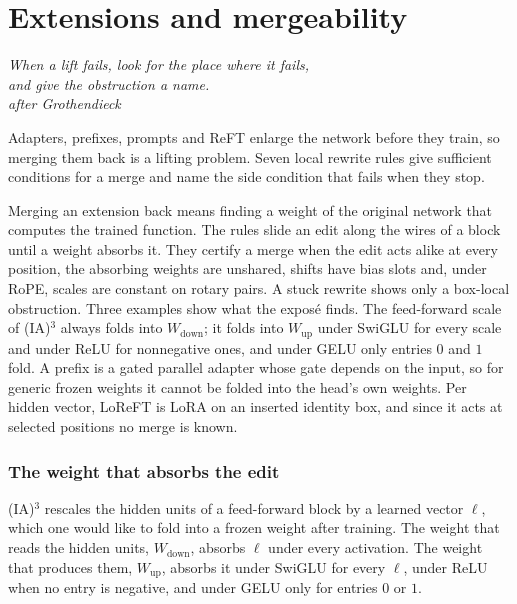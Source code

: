\section{Extensions and mergeability}\label{sec:merge}

\begin{flushright}\small\itshape
When a lift fails, look for the place where it fails,\\
and give the obstruction a name.\\[3pt]
{\upshape\footnotesize after Grothendieck}
\end{flushright}

Adapters, prefixes, prompts and ReFT enlarge the network before they train, so merging them back is a lifting problem.
Seven local rewrite rules give sufficient conditions for a merge and name the side condition that fails when they stop.

Merging an extension back means finding a weight of the original network that computes the trained function. The rules
slide an edit along the wires of a block until a weight absorbs it. They certify a merge when the edit acts alike at
every position, the absorbing weights are unshared, shifts have bias slots and, under RoPE, scales are constant on rotary
pairs. A stuck rewrite shows only a box-local obstruction. Three examples show what the exposé finds. The feed-forward
scale of (IA)$^3$ always folds into $W_{\mathrm{down}}$; it folds into $W_{\mathrm{up}}$ under SwiGLU for every scale
and under ReLU for nonnegative ones, and under GELU only entries $0$ and $1$ fold. A prefix is a gated parallel adapter
whose gate depends on the input, so for generic frozen weights it cannot be folded into the head's own weights. Per
hidden vector, LoReFT is LoRA on an inserted identity box, and since it acts at selected positions no merge is known.

\subsubsection{The weight that absorbs the edit}\label{sec:merge-hook}

(IA)$^3$ \citep{liu2022few} rescales the hidden units of a feed-forward block by a learned vector $\ell$, which one
would like to fold into a frozen weight after training. The weight that reads the hidden units, $W_{\mathrm{down}}$,
absorbs $\ell$ under every activation. The weight that produces them, $W_{\mathrm{up}}$, absorbs it under SwiGLU for
every $\ell$, under ReLU when no entry is negative, and under GELU only for entries $0$ or $1$.

